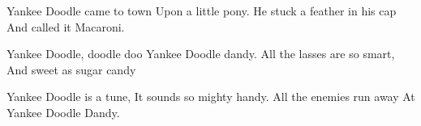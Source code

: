 \beginverse
Yankee Doodle came to town
Upon a little pony.
He stuck a feather in his cap
And called it Macaroni.
\endverse

\beginchorus
Yankee Doodle, doodle doo
Yankee Doodle dandy.
All the lasses are so smart,
And sweet as sugar candy
\endchorus

\beginverse
Yankee Doodle is a tune,
It sounds so mighty handy.
All the enemies run away
At Yankee Doodle Dandy.
\endverse

\endsong